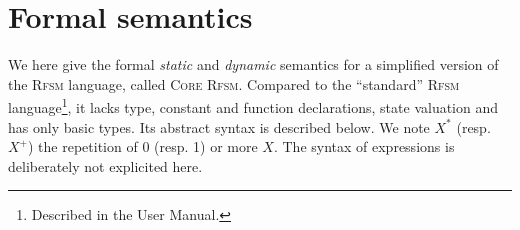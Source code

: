 \chapter{Formal semantics}
\label{cha:semantics}

\newcommand{\truev}{\mathsf{T}}
\newcommand{\tuple}[1]{\langle#1\rangle}
\newcommand{\ttuple}[2]{\langle#1, #2\rangle}
\newcommand{\tttuple}[3]{\langle#1, #2, #3\rangle}
\newcommand{\ttttuple}[4]{\langle#1, #2, #3, #4\rangle}
\newcommand{\tttttuple}[5]{\langle#1, #2, #3, #4, #5\rangle}
\newcommand{\ttttttuple}[6]{\langle#1, #2, #3, #4, #5, #6\rangle}
\newcommand{\tttttttuple}[7]{\langle#1, #2, #3, #4, #5, #6\rangle}
\newcommand{\ttttttttuple}[8]{\langle#1, #2, #3, #4, #5, #6\rangle}
\newcommand{\tuplen}[1]{\langle#1_1,\ldots,#1_n\rangle}
\newcommand{\tuplez}{\langle\rangle}
\newcommand{\cupp}[3]{\displaystyle{\bigcup_{#1}^{#2}}~#3}
\newcommand{\capp}[3]{\displaystyle{\bigcap_{#1}^{#2}}~#3}
\newcommand{\oplusn}[3]{\displaystyle{\bigoplus_{#1}^{#2}}~#3}
\newcommand{\valred}[2]{\rho_{#2}(#1)}
\newcommand{\emptyseq}{\langle\rangle}
\newcommand{\sequ}[1]{\langle#1\rangle}
\newcommand{\ssequ}[2]{\langle#1; #2\rangle}
\newcommand{\sssequ}[3]{\langle#1; #2; #3\rangle}
\newcommand{\sequn}[1]{\langle#1_1;\ldots;#1_n\rangle}
\newcommand{\sequm}[2]{\langle#1_1;\ldots;#1_#2\rangle}
\newcommand{\squn}[1]{#1_1,\ldots,#1_n}

\newcommand{\delt}[4]{\ttttuple{#1}{#2}{#3}{#4}}
\newcommand{\trans}[3]{#1 \xrightarrow{#2} #3}
\newcommand{\transs}[4]{#1 \xrightarrow[#3]{#2} #4}
\newcommand\doubleplus{+\kern-1.3ex+\kern0.8ex}

\newcommand{\larrow}{\xrightarrow}
\newcommand{\seqn}[3]{#3_#1,\ldots,#3_#2}
\newcommand{\cuppn}[1]{\cupp{i=1}{n}{#1}}
\newcommand{\setn}[1]{\{#1_1,\ldots,#1_n\}}
\newcommand{\mm}{\mathcal{M}}
\newcommand{\ssigma}{\overline{\sigma}}
\newcommand{\ssigm}{\overline{s}}
\newcommand{\eval}[2]{\mathcal{E}_{#1}\llbracket #2 \rrbracket}
\newcommand{\falln}[3]{\forall #1\in\{#2,\ldots,#3\}\quad}
\newcommand{\semfn}[3]{\mathcal{#1}_{#2}\llbracket #3 \rrbracket}
\newcommand{\vars}{\mathcal{V}}
\newcommand{\env}{\Gamma}
\newcommand{\expr}{\mathsf{e}}
\newcommand{\cupdot}{\mathbin{\mathaccent\cdot\cup}}

We here give the formal \emph{static} and \emph{dynamic} semantics for a simplified version of the
\textsc{Rfsm} language, called \textsc{Core Rfsm}. Compared to the ``standard'' \textsc{Rfsm}
language\footnote{Described in the User Manual.},
it lacks type, constant and function declarations, state valuation and has only basic types. 
Its abstract syntax is described below. We note $X^*$ (resp. $X^+$) the repetition of 0
(resp. 1) or more $X$. The syntax of expressions is deliberately not explicited here. 


